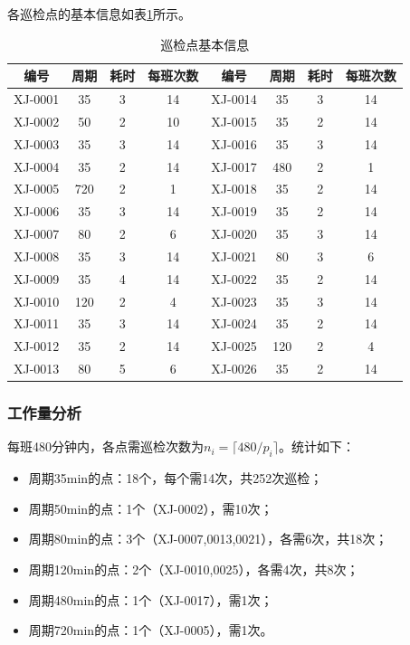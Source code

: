 \documentclass[12pt,a4paper]{article}
\begin{document}
各巡检点的基本信息如表\ref{tab:basic_info}所示。

\begin{table}[H]
\centering
\caption{巡检点基本信息}
\label{tab:basic_info}
\small
\begin{tabular}{cccc|cccc}
\toprule
编号 & 周期 & 耗时 & 每班次数 & 编号 & 周期 & 耗时 & 每班次数 \\
\midrule
XJ-0001 & 35 & 3 & 14 & XJ-0014 & 35 & 3 & 14 \\
XJ-0002 & 50 & 2 & 10 & XJ-0015 & 35 & 2 & 14 \\
XJ-0003 & 35 & 3 & 14 & XJ-0016 & 35 & 3 & 14 \\
XJ-0004 & 35 & 2 & 14 & XJ-0017 & 480 & 2 & 1 \\
XJ-0005 & 720 & 2 & 1 & XJ-0018 & 35 & 2 & 14 \\
XJ-0006 & 35 & 3 & 14 & XJ-0019 & 35 & 2 & 14 \\
XJ-0007 & 80 & 2 & 6 & XJ-0020 & 35 & 3 & 14 \\
XJ-0008 & 35 & 3 & 14 & XJ-0021 & 80 & 3 & 6 \\
XJ-0009 & 35 & 4 & 14 & XJ-0022 & 35 & 2 & 14 \\
XJ-0010 & 120 & 2 & 4 & XJ-0023 & 35 & 3 & 14 \\
XJ-0011 & 35 & 3 & 14 & XJ-0024 & 35 & 2 & 14 \\
XJ-0012 & 35 & 2 & 14 & XJ-0025 & 120 & 2 & 4 \\
XJ-0013 & 80 & 5 & 6 & XJ-0026 & 35 & 2 & 14 \\
\bottomrule
\end{tabular}
\end{table}

\subsubsection{工作量分析}

每班480分钟内，各点需巡检次数为$n_i = \lceil 480/p_i \rceil$。统计如下：

\begin{itemize}
    \item 周期35min的点：18个，每个需14次，共252次巡检；
    \item 周期50min的点：1个（XJ-0002），需10次；
    \item 周期80min的点：3个（XJ-0007,0013,0021），各需6次，共18次；
    \item 周期120min的点：2个（XJ-0010,0025），各需4次，共8次；
    \item 周期480min的点：1个（XJ-0017），需1次；
    \item 周期720min的点：1个（XJ-0005），需1次。
\end{itemize}
\end{document}
